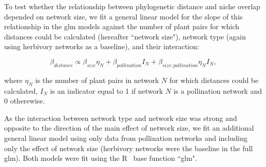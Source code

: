 \documentclass[12pt]{article}
\begin{document}
\begin{spacing}{1.5}
  To test whether the relationship between phylogenetic distance and niche overlap depended on network size, we fit a general linear model for the slope of this relationship in the glm models against the number of plant pairs for which distances could be calculated (hereafter ``network size"), network type (again using herbivory networks as a baseline), and their interaction:

    \begin{equation}
      \beta_{distance} \propto \beta_{size} \eta_{N} + \beta_{pollination} I_N + \beta_{size:pollination} \eta_{N} I_N ,
    \end{equation}

  where $\eta_{N}$ is the number of plant pairs in network $N$ for which distances could be calculated, $I_N$ is an indicator equal to 1 if network $N$ is a pollination network and 0 otherewise. 


  As the interaction between network type and network size was strong and opposite to the direction of the main effect of network size, we fit an additional general linear model using only data from pollination networks and including only the effect of network size (herbivory networks were the baseline in the full glm). Both models were fit using the R~\citep{R} base function ``glm".




\end{spacing}
\end{document}

